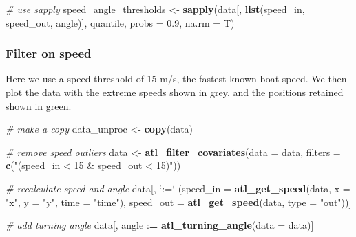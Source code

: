 \documentclass[]{scrartcl}
\newenvironment{Shaded}{}{}
\newcommand{\CommentTok}[1]{\textcolor[rgb]{0.38,0.63,0.69}{\textit{#1}}}
\newcommand{\DataTypeTok}[1]{\textcolor[rgb]{0.56,0.13,0.00}{#1}}
\newcommand{\ErrorTok}[1]{\textcolor[rgb]{1.00,0.00,0.00}{\textbf{#1}}}
\newcommand{\FloatTok}[1]{\textcolor[rgb]{0.25,0.63,0.44}{#1}}
\newcommand{\KeywordTok}[1]{\textcolor[rgb]{0.00,0.44,0.13}{\textbf{#1}}}
\newcommand{\NormalTok}[1]{#1}
\newcommand{\OperatorTok}[1]{\textcolor[rgb]{0.40,0.40,0.40}{#1}}
\newcommand{\StringTok}[1]{\textcolor[rgb]{0.25,0.44,0.63}{#1}}
\begin{document}
\begin{Shaded}
\begin{Highlighting}[]
\CommentTok{# use sapply}
\NormalTok{speed_angle_thresholds <-}\StringTok{ }
\StringTok{  }\KeywordTok{sapply}\NormalTok{(data[, }\KeywordTok{list}\NormalTok{(speed_in, speed_out, angle)], }
\NormalTok{       quantile, }\DataTypeTok{probs =} \FloatTok{0.9}\NormalTok{, }\DataTypeTok{na.rm =}\NormalTok{ T)}
\end{Highlighting}
\end{Shaded}

\hypertarget{filter-on-speed}{%
\subsubsection{Filter on speed}\label{filter-on-speed}}

Here we use a speed threshold of 15 m/s, the fastest known boat speed.
We then plot the data with the extreme speeds shown in grey, and the positions retained shown in green.

\begin{Shaded}
\begin{Highlighting}[]
\CommentTok{# make a copy}
\NormalTok{data_unproc <-}\StringTok{ }\KeywordTok{copy}\NormalTok{(data)}

\CommentTok{# remove speed outliers}
\NormalTok{data <-}\StringTok{ }\KeywordTok{atl_filter_covariates}\NormalTok{(}\DataTypeTok{data =}\NormalTok{ data,}
            \DataTypeTok{filters =} \KeywordTok{c}\NormalTok{(}\StringTok{"(speed_in < 15 & speed_out < 15)"}\NormalTok{))}

\CommentTok{# recalculate speed and angle}
\NormalTok{data[, }\StringTok{`}\DataTypeTok{:=}\StringTok{`}\NormalTok{ (}\DataTypeTok{speed_in =} \KeywordTok{atl_get_speed}\NormalTok{(data, }
                                      \DataTypeTok{x =} \StringTok{"x"}\NormalTok{, }
                                      \DataTypeTok{y =} \StringTok{"y"}\NormalTok{, }
                                      \DataTypeTok{time =} \StringTok{"time"}\NormalTok{),}
             \DataTypeTok{speed_out =} \KeywordTok{atl_get_speed}\NormalTok{(data, }\DataTypeTok{type =} \StringTok{"out"}\NormalTok{))]}

\CommentTok{# add turning angle}
\NormalTok{data[, angle }\OperatorTok{:}\ErrorTok{=}\StringTok{ }\KeywordTok{atl_turning_angle}\NormalTok{(}\DataTypeTok{data =}\NormalTok{ data)]}
\end{Highlighting}
\end{Shaded}
\end{document}
